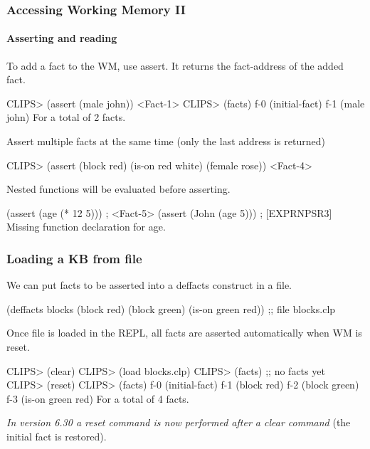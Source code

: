 \documentclass[xcolor={usenames,dvipsnames,svgnames}, compress]{beamer}
\begin{document}
\begin{frame}[fragile]
  \frametitle{Accessing Working Memory II}
  \framesubtitle{Asserting and reading}
  To add a fact to the WM, use \textsf{assert}. It returns the
  \textsf{fact-address} of the added fact.
  \begin{clips-code}
    CLIPS> (assert (male john))
    <Fact-1>
    CLIPS> (facts)
    f-0     (initial-fact)
    f-1     (male john)
    For a total of 2 facts.
  \end{clips-code}
  Assert multiple facts at the same time (only the last address is returned)
  \begin{clips-code}[firstnumber=7]
    CLIPS> (assert (block red) (is-on red white) (female rose))
    <Fact-4>
  \end{clips-code}

  Nested functions will be evaluated before asserting.
  \begin{clips-code}[numbers=none]
    (assert (age (* 12 5))) ; <Fact-5>
    (assert (John (age 5))) ; [EXPRNPSR3] Missing function declaration for age.
  \end{clips-code}
\end{frame}

\begin{frame}[fragile]
  \frametitle{Loading a KB from file}
  We can put facts to be asserted into a \textsf{deffacts} construct
  in a file.
  \begin{clips-code}[numbers=none]
    (deffacts blocks
        (block red) (block green) (is-on green red))
    ;; file blocks.clp    
      \end{clips-code}
  Once file is \textsf{loaded} in the REPL, all facts are
  asserted automatically when WM is \textsf{reset}.\par
  \begin{clips-code}
    CLIPS> (clear)
    CLIPS> (load blocks.clp)
    CLIPS> (facts) ;; no facts yet
    CLIPS> (reset)
    CLIPS> (facts)
    f-0     (initial-fact)
    f-1     (block red)
    f-2     (block green)
    f-3     (is-on green red)
    For a total of 4 facts.
  \end{clips-code}
  \emph{In version 6.30 a reset command is now performed after a clear
    command} (the initial fact is restored).\par\bigskip 
\end{frame}
\end{document}
